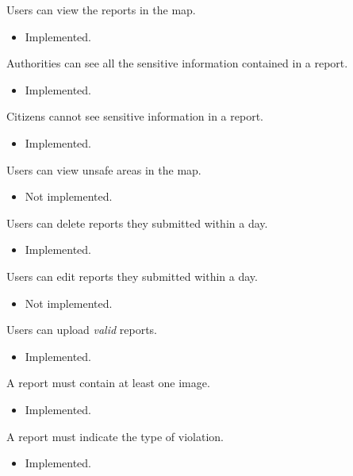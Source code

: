 \documentclass[../ITD.tex]{subfiles}
\begin{document}
\begin{enumerate}
         Users can view the reports in the map.
        \begin{itemize}
            \item Implemented.
        \end{itemize}


         Authorities can see all the sensitive information contained in a report.
        \begin{itemize}
            \item Implemented.
        \end{itemize}

         Citizens cannot see sensitive information in a report.
        \begin{itemize}
            \item Implemented.
        \end{itemize}

         Users can view unsafe areas in the map.
        \begin{itemize}
            \item Not implemented.
        \end{itemize}

         Users can delete reports they submitted within a day.
        \begin{itemize}
            \item Implemented.
        \end{itemize}

         Users can edit reports they submitted within a day.
        \begin{itemize}
            \item Not implemented.
        \end{itemize}

         Users can upload \textit{valid} reports.
        \begin{itemize}
            \item Implemented.
        \end{itemize}

         A report must contain at least one image.
        \begin{itemize}
            \item Implemented.
        \end{itemize}

         A report must indicate the type of violation.
        \begin{itemize}
            \item Implemented.
        \end{itemize}


\end{enumerate}
\end{document}
